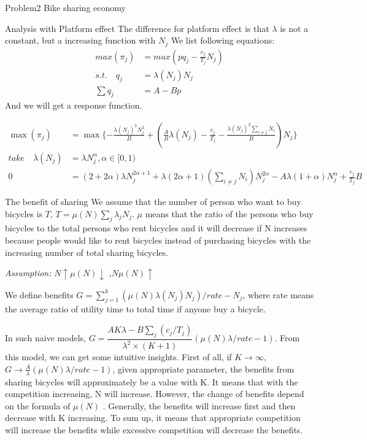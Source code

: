 \documentclass[letterpaper,12pt]{article}
\begin{document}
\begin{section}{Problem2 Bike sharing economy}
	 \begin{subsection}{Analysis with Platform effect}
	 	The difference for platform effect is that $\lambda$ is not a constant, but a increasing function with $N_j$
	 	We list following equations:
	 	\begin{align}
	 		max(\pi_j) &= max(pq_j-\frac{c_j}{T_j}N_j)   \\ 
	 		s.t. \quad q_j   &= \lambda(N_j) N_j\\
	 			\sum\limits q_j &=A - Bp
	 	\end{align}
	 	And we will get a response function.

    \begin{align}
      \max(\pi_j) &= \max\{ - \frac{\lambda(N_j)^2 N_j^2}{B}+(\frac{A}{B}\lambda(N_j) -\frac{c_j}{T_j}-\frac{\lambda (N_j)^2 \sum\limits_{i\not=j}N_i }{B})N_j \} \\
      take \quad \lambda(N_j) &= \lambda N_j^{\alpha}, \alpha\in [0,1)\\
      0 &= (2+2\alpha)\lambda N_j^{2\alpha+1}+\lambda(2\alpha+1)(\sum\limits_{i\not=j}N_i)N_j^{2\alpha}-A\lambda(1+\alpha)N_j^\alpha+\frac{c_j}{T_j}B
    \end{align}

	 \end{subsection}

	 \begin{subsection}{The benefit of sharing}
    We assume that the number of person who want to buy bicycles is $T$, $T =\mu(N) \sum\limits_j \lambda_j N_j$. $\mu$ means that the ratio of the persons who buy bicycles to the total persons who rent bicycles and it will decrease if N increases because people would like to rent bicycles instead of purchasing bicycles with the increasing number of total sharing bicycles. \\ \par

    \emph{Assumption:} $N\uparrow \mu(N)\downarrow$ ,$N \mu(N)\uparrow$\\ \par

	 	We define benefits $G=\sum\limits_{j=1}^k (\mu(N)\lambda(N_j)N_j)/rate-N_j$, where rate means the average ratio of utility time to total time if anyone buy a bicycle.\\ \par 

    In such naive models, $G =\dfrac{AK \lambda-B\sum_j (c_j/T_j)}{\lambda^2\times(K+1)}(\mu(N)\lambda /rate-1)$. From this model, we can get some intuitive insights. First of all, if $K \to \infty$, $G\to \frac{A}{\lambda}(\mu(N)\lambda/rate - 1)$, given appropriate parameter, the benefits from sharing bicycles will approximately be a value with K. It means that with the competition increasing, N will increase. However, the change of benefits depend on the formula of $\mu(N)$ . Generally, the benefits will increase first and then decrease with K increasing. To sum up, it means that appropriate competition will increase the benefits while excessive competition will decrease the benefits.\\ \par


\end{subsection}
\end{section}
\end{document}
